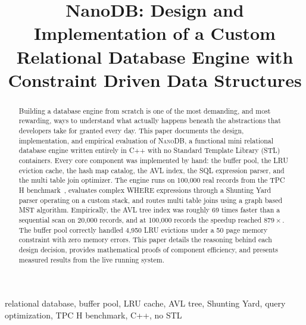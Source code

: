 \documentclass[conference]{IEEEtran}
\newcommand{\NanoDB}{\textsc{NanoDB}}
\begin{document}

\title{NanoDB: Design and Implementation of a Custom Relational
Database Engine with Constraint Driven Data Structures}

\author{
}

\maketitle

\begin{abstract}
Building a database engine from scratch is one of the most demanding, and most
rewarding, ways to understand what actually happens beneath the abstractions that
developers take for granted every day. This paper documents the design,
implementation, and empirical evaluation of \NanoDB, a functional
mini relational database engine written entirely in C++ with no Standard Template
Library (STL) containers. Every core component was implemented by hand: the
buffer pool, the LRU eviction cache, the hash map catalog, the AVL index, the
SQL expression parser, and the multi table join optimizer. The engine runs on
100,000 real records from the TPC H benchmark~\cite{tpch2023}, evaluates complex
WHERE expressions through a Shunting Yard parser operating on a custom stack, and
routes multi table joins using a graph based MST algorithm. Empirically, the AVL
tree index was roughly 69 times faster than a sequential scan on 20,000 records,
and at 100,000 records the speedup reached $879\times$. The buffer pool correctly
handled 4,950 LRU evictions under a 50 page memory constraint with zero memory
errors. This paper details the reasoning behind each design decision, provides
mathematical proofs of component efficiency, and presents measured results from
the live running system.
\end{abstract}

\begin{IEEEkeywords}
relational database, buffer pool, LRU cache, AVL tree, Shunting Yard,
query optimization, TPC H benchmark, C++, no STL
\end{IEEEkeywords}
\end{document}
